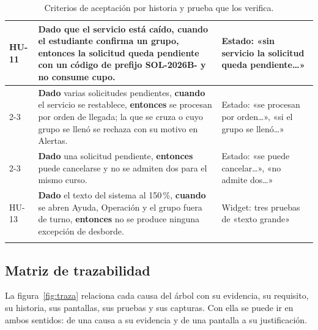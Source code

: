 \begin{longtable}{|p{1.1cm}|p{9.3cm}|p{3.4cm}|}
	HU-11 & \textbf{Dado} que el servicio está caído, \textbf{cuando} el estudiante confirma un grupo, \textbf{entonces} la solicitud queda pendiente con un código de prefijo SOL-2026B- y no consume cupo. & Estado: «sin servicio la solicitud queda pendiente…» \\\cline{2-3}
	& \textbf{Dado} varias solicitudes pendientes, \textbf{cuando} el servicio se restablece, \textbf{entonces} se procesan por orden de llegada; la que se cruza o cuyo grupo se llenó se rechaza con su motivo en Alertas. & Estado: «se procesan por orden…», «si el grupo se llenó…» \\\cline{2-3}
	& \textbf{Dado} una solicitud pendiente, \textbf{entonces} puede cancelarse y no se admiten dos para el mismo curso. & Estado: «se puede cancelar…», «no admite dos…» \\\hline
	HU-13 & \textbf{Dado} el texto del sistema al 150\,\%, \textbf{cuando} se abren Ayuda, Operación y el grupo fuera de turno, \textbf{entonces} no se produce ninguna excepción de desborde. & Widget: tres pruebas de «texto grande» \\\hline
	\caption{Criterios de aceptación por historia y prueba que los verifica.}
	\label{tab:criterios}
\end{longtable}

\subsection{Matriz de trazabilidad}
\label{sec:traza}
La figura~\ref{fig:traza} relaciona cada causa del árbol con su evidencia, su requisito, su historia, sus pantallas, sus pruebas y sus capturas. Con ella se puede ir en ambos sentidos: de una causa a su evidencia y de una pantalla a su justificación.

